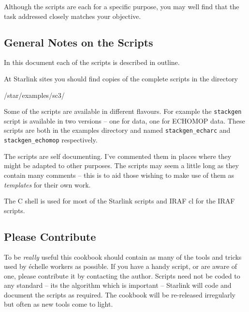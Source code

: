 \documentclass[twoside,11pt]{starlink}
\providecommand{\scspec}[2]{#1}
\begin{document}
Although the scripts are each for a specific purpose, you may well find that
the task addressed closely matches your objective.

\subsection*{General Notes on the Scripts }

In this document each of the scripts is described in outline.

At Starlink sites you should find copies of the complete scripts in the
directory

\begin{terminalv}
/star/examples/sc3/
\end{terminalv}




Some of the scripts are available in different flavours.  For example
the \verb+stackgen+ script is available in two versions \scspec{--}{-}
one for   data, one for
ECHOMOP data.  These scripts are both in the examples directory and named
\verb+stackgen_echarc+ and \verb+stackgen_echomop+ respectively.

The scripts are self documenting.
I've commented them in places where they might be adapted to other
purposes.
The scripts may seem a little long as they contain many comments
\scspec{--}{-} this is to aid those wishing to make use of them as
\emph{templates} for their own work.

The C shell is used for most of the Starlink scripts and IRAF cl for the
IRAF scripts.


\subsection*{Please Contribute }

To be \emph{really} useful this cookbook should contain as many of the
tools and tricks used by \'{e}chelle workers as possible.
If you have a handy script, or are aware of one, please contribute it by
contacting the author.
Scripts need not be coded to any standard \scspec{--}{-} its the algorithm
which is important \scspec{--}{-} Starlink will code and document the scripts
as required.
The cookbook will be re-released irregularly but often as new tools come to
light.
\end{document}
